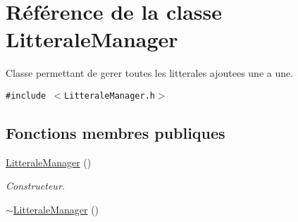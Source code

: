 \hypertarget{class_litterale_manager}{
\section{Référence de la classe LitteraleManager}
\label{class_litterale_manager}
}
Classe permettant de gerer toutes les litterales ajoutees une a une.  


{\tt \#include $<$LitteraleManager.h$>$}

\subsection*{Fonctions membres publiques}
\begin{CompactItemize}
\item 
\hypertarget{class_litterale_manager_daa9e81e06b8001e4cf9e0f5a214b6cd}{
\hyperlink{class_litterale_manager_daa9e81e06b8001e4cf9e0f5a214b6cd}{LitteraleManager} ()}
\label{class_litterale_manager_daa9e81e06b8001e4cf9e0f5a214b6cd}

\begin{CompactList}\small\item\em Constructeur. \item\end{CompactList}\item 
\hypertarget{class_litterale_manager_a6f690e84ae96ec3a15f6b629264cc1f}{
\hyperlink{class_litterale_manager_a6f690e84ae96ec3a15f6b629264cc1f}{$\sim$LitteraleManager} ()}
\label{class_litterale_manager_a6f690e84ae96ec3a15f6b629264cc1f}


\end{CompactItemize}
